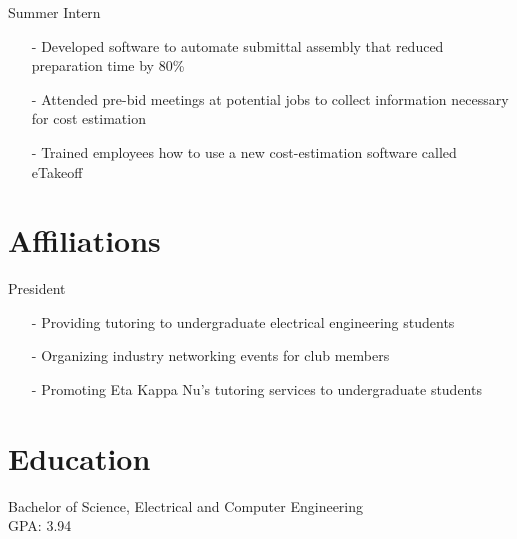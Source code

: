\documentclass{my_cv}
\begin{document}
\vspace{-0.75em}
Summer Intern
\vspace{-0.5em}
\begin{itemize}
    \item[-] Developed software to automate submittal assembly that reduced preparation time by 80\%
    \vspace{-0.75em}
    
    \item[-] Attended pre-bid meetings at potential jobs to collect information necessary for cost estimation
    \vspace{-0.75em}
    
    \item[-] Trained employees how to use a new cost-estimation software called eTakeoff
\end{itemize}

\section{Affiliations}

\vspace{-0.75em}
President
\vspace{-0.5em}
\begin{itemize}
    \item[-] Providing tutoring to undergraduate electrical engineering students
    \vspace{-0.75em}
    
    \item[-] Organizing industry networking events for club members
    \vspace{-0.75em}
    
    \item[-] Promoting Eta Kappa Nu's tutoring services to undergraduate students
\end{itemize}


\section{Education}
\vspace{-0.75em}
Bachelor of Science, Electrical and Computer Engineering \\
GPA: 3.94
\end{document}
